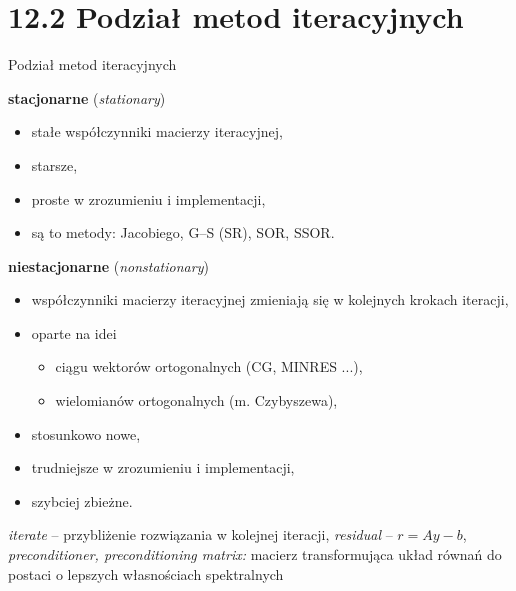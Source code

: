 \section{12.2 Podział metod iteracyjnych}

\begin{frame}{Podział metod iteracyjnych}
  \begin{block}{\textbf{stacjonarne} (\emph{stationary})}
    \begin{itemize}
      \item stałe współczynniki macierzy iteracyjnej,
      \item starsze,
      \item proste w zrozumieniu i implementacji,
      \item są to metody: Jacobiego, G--S (SR), SOR, SSOR.
    \end{itemize}
  \end{block}
\end{frame}

\begin{frame}{}
  \begin{block}{\textbf{niestacjonarne} (\emph{nonstationary})}
    \begin{itemize}
      \item współczynniki macierzy iteracyjnej zmieniają się w kolejnych krokach iteracji,
      \item oparte na idei
      \begin{itemize}
        \item ciągu wektorów ortogonalnych (CG, MINRES ...),
        \item wielomianów ortogonalnych (m. Czybyszewa),
      \end{itemize}
      \item stosunkowo nowe,
      \item trudniejsze w zrozumieniu i implementacji,
      \item szybciej zbieżne.
    \end{itemize}
  \end{block}
\end{frame}

\begin{frame}{}
  \begin{block}{}
    \emph{iterate} -- przybliżenie rozwiązania w kolejnej iteracji,
    \newline \emph{residual} -- $r=Ay-b$,
    \newline \emph{preconditioner, preconditioning matrix:} macierz transformująca układ równań do postaci o lepszych własnościach spektralnych
  \end{block}
\end{frame}
